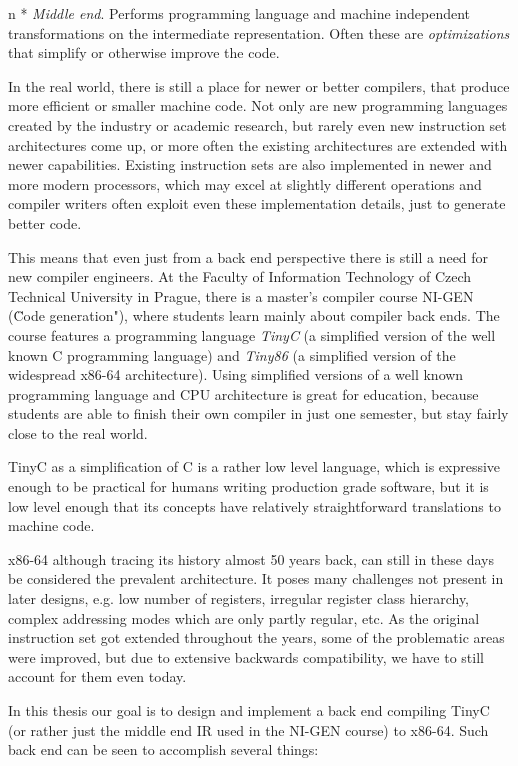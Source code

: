 \begitems \style n 
* {\em Middle end}. Performs programming language and machine independent
transformations on the intermediate representation. Often these are {\em
optimizations} that simplify or otherwise improve the code.
\enditems

In the real world, there is still a place for newer or better compilers, that
produce more efficient or smaller machine code. Not only are new programming
languages created by the industry or academic research, but rarely even new
instruction set architectures come up, or more often the existing architectures are
extended with newer capabilities. Existing instruction sets are also implemented
in newer and more modern processors, which may excel at slightly different
operations and compiler writers often exploit even these implementation
details, just to generate better code.

This means that even just from a back end perspective there is still a need for new
compiler engineers. At the Faculty of Information Technology of Czech Technical
University in Prague, there is a master's compiler course NI-GEN (\"Code
generation"), where students learn mainly about compiler back ends. The course
features a programming language {\em TinyC} (a simplified version of the well
known C programming language) and {\em Tiny86} (a simplified version of the
widespread x86-64 architecture). Using simplified versions of a well known
programming language and CPU architecture is great for education, because
students are able to finish their own compiler in just one semester, but stay
fairly close to the real world.

TinyC as a simplification of C is a rather low level language, which is
expressive enough to be practical for humans writing production grade software,
but it is low level enough that its concepts have relatively straightforward
translations to machine code.

x86-64 although tracing its history almost 50 years back, can still in these
days be considered the prevalent architecture. It poses many challenges not
present in later designs, e.g. low number of registers,
irregular register class hierarchy, complex addressing modes
which are only partly regular, etc. As the original instruction set got extended
throughout the years, some of the problematic areas were improved, but due
to extensive backwards compatibility, we have to still account for them even
today.

In this thesis our goal is to design and implement a back end compiling TinyC
(or rather just the middle end IR used in the NI-GEN course) to x86-64. Such
back end can be seen to accomplish several things:

